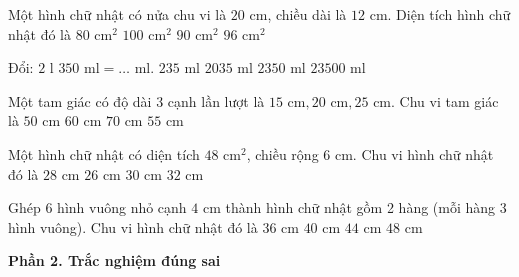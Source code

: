 \begin{ex} %
Một hình chữ nhật có nửa chu vi là $20\text{ cm}$, chiều dài là $12\text{ cm}$. Diện tích hình chữ nhật đó là
\choice
{$80\text{ cm}^2$}
{$100\text{ cm}^2$}
{$90\text{ cm}^2$}
{\True $96\text{ cm}^2$}
\end{ex}

\begin{ex} %
Đổi: $2\text{ l } 350\text{ ml} = \dots\text{ ml}$.
\choice
{$235\text{ ml}$}
{$2035\text{ ml}$}
{\True $2350\text{ ml}$}
{$23500\text{ ml}$}
\end{ex}

\begin{ex} %
Một tam giác có độ dài 3 cạnh lần lượt là $15\text{ cm}, 20\text{ cm}, 25\text{ cm}$. Chu vi tam giác là
\choice
{$50\text{ cm}$}
{\True $60\text{ cm}$}
{$70\text{ cm}$}
{$55\text{ cm}$}
\end{ex}

\begin{ex} %
Một hình chữ nhật có diện tích $48\text{ cm}^2$, chiều rộng $6\text{ cm}$. Chu vi hình chữ nhật đó là
\choice
{\True $28\text{ cm}$}
{$26\text{ cm}$}
{$30\text{ cm}$}
{$32\text{ cm}$}
\end{ex}

\begin{ex} %
Ghép 6 hình vuông nhỏ cạnh $4\text{ cm}$ thành hình chữ nhật gồm 2 hàng (mỗi hàng 3 hình vuông). Chu vi hình chữ nhật đó là
\choice
{$36\text{ cm}$}
{\True $40\text{ cm}$}
{$44\text{ cm}$}
{$48\text{ cm}$}
\end{ex}

\textbf{Phần 2. Trắc nghiệm đúng sai}

